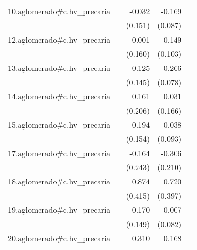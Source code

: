 {\begin{longtable}{l*{4}{D{.}{.}{-1}}}
\addlinespace
10.aglomerado#c.hv\_precaria&                     &      -0.032         &      -0.169         &                     \\
            &                     &     (0.151)         &     (0.087)         &                     \\
\addlinespace
12.aglomerado#c.hv\_precaria&                     &      -0.001         &      -0.149         &                     \\
            &                     &     (0.160)         &     (0.103)         &                     \\
\addlinespace
13.aglomerado#c.hv\_precaria&                     &      -0.125         &      -0.266\sym{***}&                     \\
            &                     &     (0.145)         &     (0.078)         &                     \\
\addlinespace
14.aglomerado#c.hv\_precaria&                     &       0.161         &       0.031         &                     \\
            &                     &     (0.206)         &     (0.166)         &                     \\
\addlinespace
15.aglomerado#c.hv\_precaria&                     &       0.194         &       0.038         &                     \\
            &                     &     (0.154)         &     (0.093)         &                     \\
\addlinespace
17.aglomerado#c.hv\_precaria&                     &      -0.164         &      -0.306         &                     \\
            &                     &     (0.243)         &     (0.210)         &                     \\
\addlinespace
18.aglomerado#c.hv\_precaria&                     &       0.874\sym{*}  &       0.720         &                     \\
            &                     &     (0.415)         &     (0.397)         &                     \\
\addlinespace
19.aglomerado#c.hv\_precaria&                     &       0.170         &      -0.007         &                     \\
            &                     &     (0.149)         &     (0.082)         &                     \\
\addlinespace
20.aglomerado#c.hv\_precaria&                     &       0.310         &       0.168         &                     \\

\end{longtable}}
